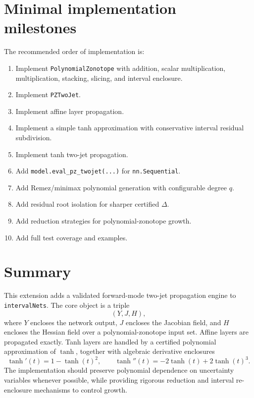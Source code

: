 \documentclass[11pt]{article}
\begin{document}
\section{Minimal implementation milestones}

The recommended order of implementation is:
\begin{enumerate}[label=\textbf{M\arabic*.}]
    \item Implement \texttt{PolynomialZonotope} with addition, scalar multiplication, multiplication, stacking, slicing, and interval enclosure.
    \item Implement \texttt{PZTwoJet}.
    \item Implement affine layer propagation.
    \item Implement a simple tanh approximation with conservative interval residual subdivision.
    \item Implement tanh two-jet propagation.
    \item Add \texttt{model.eval\_pz\_twojet(...)} for \texttt{nn.Sequential}.
    \item Add Remez/minimax polynomial generation with configurable degree \(q\).
    \item Add residual root isolation for sharper certified \(\Delta\).
    \item Add reduction strategies for polynomial-zonotope growth.
    \item Add full test coverage and examples.
\end{enumerate}

\section{Summary}

This extension adds a validated forward-mode two-jet propagation engine to \texttt{intervalNets}. The core object is a triple
\[
    (Y,J,H),
\]
where \(Y\) encloses the network output, \(J\) encloses the Jacobian field, and \(H\) encloses the Hessian field over a polynomial-zonotope input set. Affine layers are propagated exactly. Tanh layers are handled by a certified polynomial approximation of \(\tanh\), together with algebraic derivative enclosures
\[
    \tanh'(t)=1-\tanh(t)^2,
    \qquad
    \tanh''(t)=-2\tanh(t)+2\tanh(t)^3.
\]
The implementation should preserve polynomial dependence on uncertainty variables whenever possible, while providing rigorous reduction and interval re-enclosure mechanisms to control growth.
\end{document}
